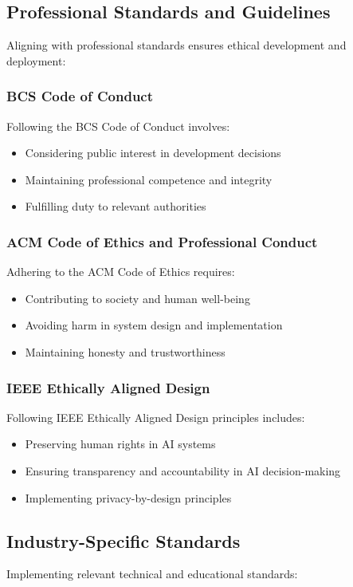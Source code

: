 \documentclass[15pt,a4paper]{article}
\begin{document}
\begin{multicols}{2}
\subsection{Professional Standards and Guidelines}
Aligning with professional standards ensures ethical development and deployment:

\subsubsection*{BCS Code of Conduct}
Following the BCS Code of Conduct \textit{\parencite[pp. 1-5]{BCS2024}} involves:
\begin{itemize}
    \item Considering public interest in development decisions
    \item Maintaining professional competence and integrity
    \item Fulfilling duty to relevant authorities
\end{itemize}

\subsubsection*{ACM Code of Ethics and Professional Conduct}
Adhering to the ACM Code of Ethics \textit{\parencite[pp. 1-4]{ACM2023}} requires:
\begin{itemize}
    \item Contributing to society and human well-being
    \item Avoiding harm in system design and implementation
    \item Maintaining honesty and trustworthiness
\end{itemize}

\subsubsection*{IEEE Ethically Aligned Design}
Following IEEE Ethically Aligned Design principles \textit{\parencite[pp. 2-5]{IEEE2024}} includes:
\begin{itemize}
    \item Preserving human rights in AI systems
    \item Ensuring transparency and accountability in AI decision-making
    \item Implementing privacy-by-design principles
\end{itemize}

\subsection{Industry-Specific Standards}
Implementing relevant technical and educational standards:


\end{multicols}
\end{document}
